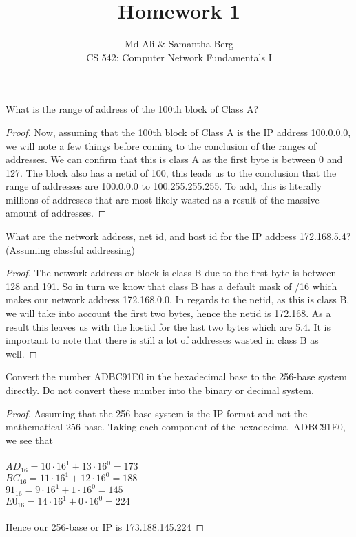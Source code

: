 \documentclass[12pt]{article}
\newenvironment{exercise}[2][Exercise]{\begin{trivlist}
\item[\hskip \labelsep {\bfseries #1}\hskip \labelsep {\bfseries #2.}]}{\end{trivlist}}
\begin{document}
 
\title{Homework 1}
\author{Md Ali \& Samantha Berg\\ 
CS 542: Computer Network Fundamentals I} 
 
\maketitle
 
\begin{exercise}{1}
What is the range of address of the 100th block of Class A?
\end{exercise} 

\begin{proof}
 Now, assuming that the 100th block of Class A is the IP address 100.0.0.0, we will note a few things before coming to the conclusion of the ranges of addresses. We can confirm that this is class A as the first byte is between 0 and 127. The block also has a netid of 100, this leads us to the conclusion that the range of addresses are 100.0.0.0 to 100.255.255.255. To add, this is literally millions of addresses that are most likely wasted as a result of the massive amount of addresses. 
\end{proof}
 
\begin{exercise}{2}
What are the network address, net id, and host id for the IP address 172.168.5.4? (Assuming classful addressing)
\end{exercise}
 
\begin{proof}
The network address or block is class B due to the first byte is between 128 and 191. So in turn we know that class B has a default mask of /16 which makes our network address 172.168.0.0. In regards to the netid, as this is class B, we will take into account the first two bytes, hence the netid is 172.168. As a result this leaves us with the hostid for the last two bytes which are 5.4. It is important to note that there is still a lot of addresses wasted in class B as well. 
\end{proof}

\begin{exercise}{3}
Convert the number ADBC91E0 in the hexadecimal base to the 256-base system directly. Do not convert these number into the binary or decimal system.
\end{exercise}

\begin{proof}
Assuming that the 256-base system is the IP format and not the mathematical 256-base. Taking each component of the hexadecimal ADBC91E0, we see that \\ \\
$AD_{16} = 10 \cdot 16^{1} + 13 \cdot 16^{0} = 173$ \\
$BC_{16} = 11 \cdot 16^{1} + 12 \cdot 16^{0} = 188$ \\
$91_{16} = 9 \cdot 16^{1} + 1 \cdot 16^{0} = 145$ \\ 
$E0_{16} = 14 \cdot 16^{1} + 0 \cdot 16^{0} = 224$ \\ \\ 
Hence our 256-base or IP is 173.188.145.224
\end{proof}
 
\end{document}
